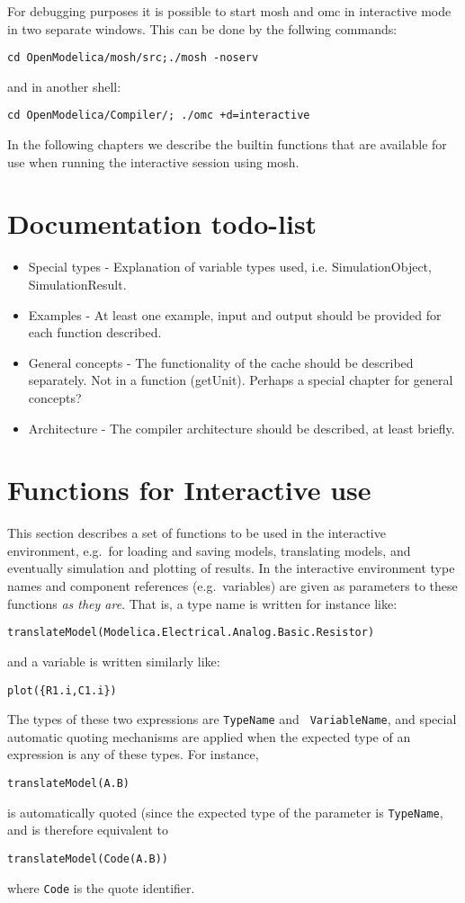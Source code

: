 \documentclass{report}
\begin{document}
For debugging purposes it is possible to start mosh and omc in
interactive mode in two separate windows. This can be done by the
follwing commands:
\begin{verbatim}
cd OpenModelica/mosh/src;./mosh -noserv
\end{verbatim}
and in another shell:
\begin{verbatim}
cd OpenModelica/Compiler/; ./omc +d=interactive 
\end{verbatim}

In the following chapters we describe the builtin functions that are
available for use when running the interactive session using mosh.


\chapter{Documentation todo-list}

\begin{itemize} 
\item{Special types} - Explanation of variable types used, i.e.
  SimulationObject, SimulationResult.
\item{Examples} - At least one example, input and output should be
  provided for each function described.
\item{General concepts} - The functionality of the cache should be described
  separately. Not in a function (getUnit). Perhaps a special chapter
  for general concepts?
\item{Architecture} - The compiler architecture should be described,
  at least briefly.

\end{itemize}


\chapter{Functions for Interactive use}
This section describes a set of functions to be used in the
interactive environment, e.g.\ for loading and saving models,
translating models, and eventually simulation and plotting of results.
In the interactive environment type names and component references
(e.g.\ variables) are given as parameters to these functions \emph{as
they are}. That is, a type name is written for instance like:
\begin{verbatim}
translateModel(Modelica.Electrical.Analog.Basic.Resistor)
\end{verbatim}
and a variable is written similarly like:
\begin{verbatim}
plot({R1.i,C1.i})
\end{verbatim}
The types of these two expressions are {\tt TypeName} and {\tt
VariableName}, and special automatic quoting mechanisms are applied
when the expected type of an expression is any of these types.
For instance,
\begin{verbatim}
translateModel(A.B)
\end{verbatim}
is automatically quoted (since the expected type of the parameter is
{\tt TypeName}, and is therefore equivalent to
\begin{verbatim}
translateModel(Code(A.B))
\end{verbatim}
where {\tt Code} is the quote identifier.
\end{document}
